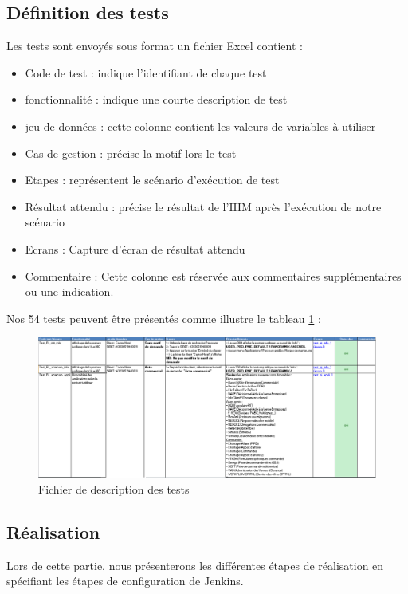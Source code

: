 \subsection{Définition des tests}
Les tests sont envoyés sous format un fichier Excel contient :
\begin{itemize}
	\item Code de test : indique l’identifiant de chaque test
	\item fonctionnalité : indique une courte description de test
	\item jeu de données : cette colonne contient les valeurs de variables à utiliser
	\item Cas de gestion : précise la motif lors le test
	\item Etapes : représentent le scénario d'exécution de test
	\item Résultat attendu : précise le résultat de l’IHM après l'exécution de notre scénario  
	\item Ecrans : Capture d’écran de résultat attendu 
	\item Commentaire : Cette colonne est réservée aux commentaires supplémentaires ou une indication.
\end{itemize}\newpage
Nos 54 tests peuvent être présentés comme illustre le tableau \ref{fig:excel-robot} :
\begin{figure}[H]
	\centering
	\includegraphics[width=1\linewidth]{"img/excel robot"}
	\caption[Fichier de description des tests]{Fichier de description des tests}
	\label{fig:excel-robot}
\end{figure}
\subsection{Réalisation}
Lors de cette partie, nous présenterons les différentes étapes de réalisation en spécifiant les étapes de configuration de Jenkins.
